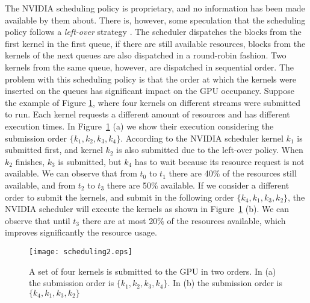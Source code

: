 \documentclass[conference]{IEEEtran}
\begin{document}
The NVIDIA scheduling policy is proprietary, and no information has been made available by them about. There is, however, some speculation that the scheduling policy follows a \textit{left-over} strategy \cite{pai2013improving}. The scheduler dispatches the blocks from the first kernel in the first queue, if there are still available resources, blocks from the kernels of the next queues are also dispatched in a round-robin fashion. Two kernels from the same queue, however, are dispatched in sequential order. The problem with this scheduling policy is that the order at which the kernels were inserted on the queues has significant impact on the GPU occupancy. Suppose the example of Figure \ref{fig:occupancy}, where four kernels on different streams were submitted to run. Each kernel requests a different amount of resources and has different execution times. In Figure~\ref{fig:occupancy} (a) we show their execution considering the submission order $\{k_1, k_2, k_3, k_4\}$. According to the NVIDIA scheduler kernel $k_1$ is submitted first, and kernel $k_2$ is also submitted due to the left-over policy. When $k_2$ finishes, $k_3$ is submitted, but $k_4$ has to wait because its resource request is not available. We can observe that from $t_0$ to $t_1$ there are 40\% of the resources still available, and from $t_2$ to $t_3$ there are 50\% available. If we consider a different order to submit the kernels, and submit in the following order $\{k_4, k_1, k_3, k_2\}$, the NVIDIA scheduler will execute the kernels as shown in Figure~\ref{fig:occupancy} (b). We can observe that until $t_3$ there are at most 20\% of the resources available, which improves significantly the resource usage. 

\begin{figure}[htb]
\centering
\texttt{[image: scheduling2.eps]}
\caption{A set of four kernels is submitted to the GPU in two orders. In (a) the submission order is $\{k_1, k_2, k_3, k_4\}$. In (b) the submission order is $\{k_4, k_1, k_3, k_2\}$}
\label{fig:occupancy}
\end{figure}
\end{document}
